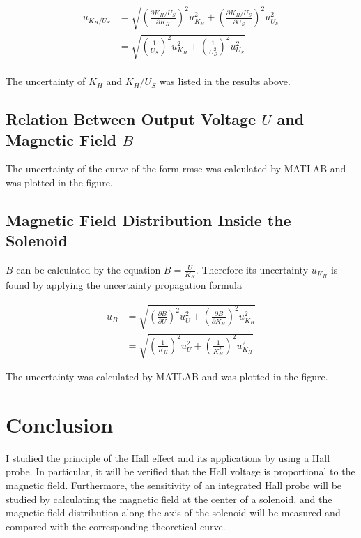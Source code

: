 \documentclass{article}
\begin{document}
\begin{align*}
u_{K_H/U_S}&=\sqrt{\left(\frac{\partial K_H/U_S}{\partial K_H}\right)^2u_{K_H}^2+\left(\frac{\partial K_H/U_S}{\partial U_S}\right)^2u_{U_S}^2}\\
&=\sqrt{\left(\frac{1}{U_S}\right)^2u_{K_H}^2+\left(\frac{1}{U_S^2}\right)^2u_{U_S}^2}\\
\end{align*}

The uncertainty of $K_H$ and $K_H/U_S$ was listed in the results above.

\subsection{Relation Between Output Voltage $ U $ and Magnetic Field $ B $}

The uncertainty of the curve of the form rmse was calculated by MATLAB and was plotted in the figure.

\subsection{Magnetic Field Distribution Inside the Solenoid}

$B$ can be calculated by the equation $B=\frac{U}{K_H}$. Therefore its uncertainty $u_{K_H}$ is found by applying the uncertainty propagation formula

\begin{align*}
u_{B}&=\sqrt{\left(\frac{\partial B}{\partial U}\right)^2u_U^2+\left(\frac{\partial B}{\partial K_H}\right)^2u_{K_H}^2}\\
&=\sqrt{\left(\frac{1}{K_H}\right)^2u_U^2+\left(\frac{1}{K_H^2}\right)^2u_{K_H}^2}
\end{align*}

The uncertainty was calculated by MATLAB and was plotted in the figure.


\section{Conclusion}

I studied the principle of the Hall effect and its applications by using a Hall probe.  In particular, it will be verified that the Hall voltage is proportional to the magnetic field. Furthermore, the sensitivity of an integrated Hall probe will be studied by calculating the magnetic field at the center of a solenoid, and the magnetic field distribution along the axis of the solenoid will be measured and compared with the corresponding theoretical curve.\\
\end{document}
